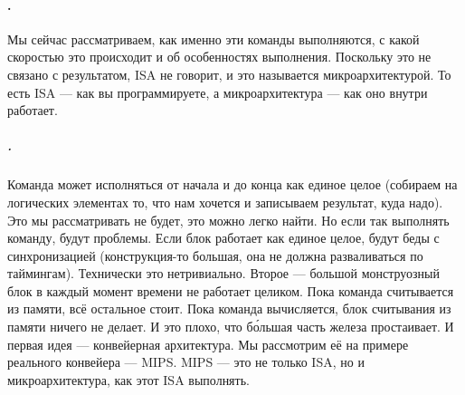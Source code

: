\documentclass{article}
\makeatletter
\newcommand\currentnode{\the\tikz@lastxsaved,\the\tikz@lastysaved}
\makeatother
\begin{document}
    \paragraph{.}
    Мы сейчас рассматриваем, как именно эти команды выполняются, с какой скоростью это происходит и об особенностях выполнения. Поскольку это не связано с результатом, ISA не говорит, и это называется микроархитектурой. То есть ISA --- как вы программируете, а микроархитектура --- как оно внутри работает.
    \subparagraph{.}
    Команда может исполняться от начала и до конца как единое целое (собираем на логических элементах то, что нам хочется и записываем результат, куда надо). Это мы рассматривать не будет, это можно легко найти. Но если так выполнять команду, будут проблемы. Если блок работает как единое целое, будут беды с синхронизацией (конструкция-то большая, она не должна разваливаться по таймингам). Технически это нетривиально. Второе --- большой монструозный блок в каждый момент времени не работает целиком. Пока команда считывается из памяти, всё остальное стоит. Пока команда вычисляется, блок считывания из памяти ничего не делает. И это плохо, что б\'{о}льшая часть железа простаивает. И первая идея --- конвейерная архитектура. Мы рассмотрим её на примере реального конвейера --- MIPS. MIPS --- это не только ISA, но и микроархитектура, как этот ISA выполнять.
    \begin{center}
    \end{center}
\end{document}
